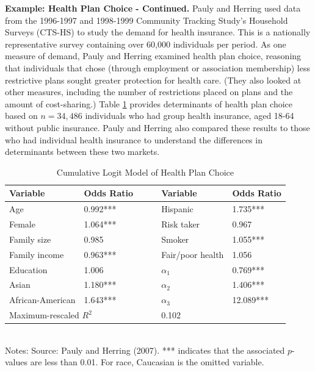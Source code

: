\linejed{}

\textbf{Example: Health Plan Choice - Continued.} Pauly and Herring
used data from the 1996-1997 and 1998-1999 Community Tracking
Study's Household Surveys (CTS-HS) to study the demand for health
insurance. This is a nationally representative survey containing
over 60,000 individuals per period. As one measure of demand, Pauly
and Herring examined health plan choice, reasoning that individuals
that chose (through employment or association membership) less
restrictive plans sought greater protection for health care. (They
also looked at other measures, including the number of restrictions
placed on plans and the amount of cost-sharing.) Table
\ref{T11:PaulyHerring} provides determinants of health plan choice
based on $n=34,486$ individuals who had group health insurance, aged
18-64 without public insurance. Pauly and Herring also compared
these results to those who had individual health insurance to
understand the differences in determinants between these two
markets.

\begin{table}[h]
\caption{\label{T11:PaulyHerring} Cumulative Logit Model of Health
Plan Choice}
\begin{center}
\begin{tabular}{llll}
\hline Variable  & Odds Ratio~~~~ & Variable  & Odds Ratio \\
\hline Age & 0.992*** & Hispanic & 1.735*** \\
Female & 1.064*** & Risk taker & 0.967 \\
Family size & 0.985 & Smoker & 1.055*** \\
Family income & 0.963*** & Fair/poor health & 1.056 \\
Education & 1.006 & $\alpha_1$ & 0.769*** \\
Asian & 1.180*** & $\alpha_2$ & 1.406*** \\
African-American & 1.643*** & $\alpha_3$ & 12.089*** \\
\hline \multicolumn{2}{l}{Maximum-rescaled $R^2$} & 0.102 & \\
\hline
\end{tabular}\\
Notes: Source: Pauly and Herring (2007). *** indicates that the
associated $p$-values are less than 0.01. For race, Caucasian is the
omitted variable.
\end{center}\end{table}

